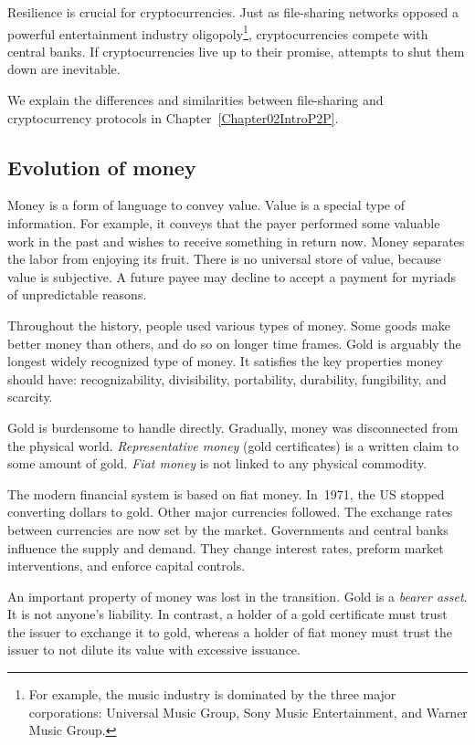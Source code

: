 Resilience is crucial for cryptocurrencies.
Just as file-sharing networks opposed a powerful entertainment industry oligopoly\footnote{For example, the music industry is dominated by the three major corporations: Universal Music Group, Sony Music Entertainment, and Warner Music Group.}, cryptocurrencies compete with central banks.
If cryptocurrencies live up to their promise, attempts to shut them down are inevitable.

We explain the differences and similarities between file-sharing and cryptocurrency protocols in Chapter~\ref{Chapter02IntroP2P}.


\subsection{Evolution of money}

Money is a form of language to convey value.
Value is a special type of information.
For example, it conveys that the payer performed some valuable work in the past and wishes to receive something in return now.
Money separates the labor from enjoying its fruit.
There is no universal store of value, because value is subjective.
A future payee may decline to accept a payment for myriads of unpredictable reasons.

Throughout the history, people used various types of money.
Some goods make better money than others, and do so on longer time frames.
Gold is arguably the longest widely recognized type of money.
It satisfies the key properties money should have: recognizability, divisibility, portability, durability, fungibility, and scarcity.

Gold is burdensome to handle directly.
Gradually, money was disconnected from the physical world.
\textit{Representative money} (gold certificates) is a written claim to some amount of gold.
\textit{Fiat money} is not linked to any physical commodity.

The modern financial system is based on fiat money.
In~1971, the US stopped converting dollars to gold.
Other major currencies followed.
The exchange rates between currencies are now set by the market.
Governments and central banks influence the supply and demand.
They change interest rates, preform market interventions, and enforce capital controls.

An important property of money was lost in the transition.
Gold is a \textit{bearer asset}.
It is not anyone's liability.
In contrast, a holder of a gold certificate must trust the issuer to exchange it to gold, whereas a holder of fiat money must trust the issuer to not dilute its value with excessive issuance.


